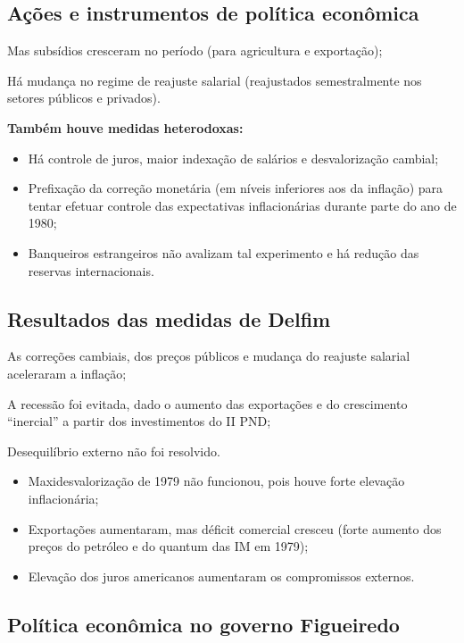 \documentclass[a4paper,12pt]{article}[abntex2]
\begin{document}
\subsection{\textbf{Ações e instrumentos de política econômica}}

Mas subsídios cresceram no período (para agricultura e exportação);

Há mudança no regime de reajuste salarial (reajustados semestralmente nos setores públicos e privados).


\textbf{Também houve medidas heterodoxas:}\begin{itemize}
    \item Há controle de juros, maior indexação de salários e desvalorização cambial;
    \item Prefixação da correção monetária (em níveis inferiores aos da inflação) para tentar efetuar controle das expectativas inflacionárias durante parte do ano de 1980;
    \item Banqueiros estrangeiros não avalizam tal experimento e há redução das reservas internacionais.
\end{itemize}

\subsection{\textbf{Resultados das medidas de Delfim}}

As correções cambiais, dos preços públicos e mudança do reajuste salarial aceleraram a inflação;

A recessão foi evitada, dado o aumento das exportações e do crescimento ``inercial'' a partir dos investimentos do II PND;

Desequilíbrio externo não foi resolvido.\begin{itemize}
    \item Maxidesvalorização de 1979 não funcionou, pois houve forte elevação inflacionária;
    \item Exportações aumentaram, mas déficit comercial cresceu (forte aumento dos preços do petróleo e do quantum das IM em 1979);
    \item Elevação dos juros americanos aumentaram os compromissos externos.
\end{itemize}

\subsection{\textbf{Política econômica no governo Figueiredo}}
\end{document}
